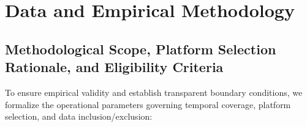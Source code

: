 \documentclass[preprint,12pt]{elsarticle}
\begin{document}
\section{Data and Empirical Methodology}\label{sec:methodology}

\subsection{Methodological Scope, Platform Selection Rationale, and Eligibility Criteria}

To ensure empirical validity and establish transparent boundary conditions, we formalize the operational parameters governing temporal coverage, platform selection, and data inclusion/exclusion:
\end{document}
